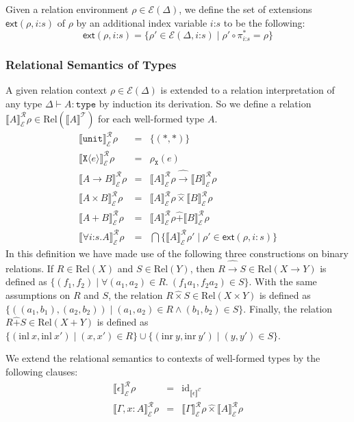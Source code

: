 \documentclass[natbib,preprint]{sigplanconf}
\newcommand{\sepbar}{\mathrel|}
\newcommand{\Rel}{\mathrm{Rel}}
\newcommand{\relArrow}{\mathrel{\widehat\to}}
\newcommand{\relTimes}{\mathrel{\widehat\times}}
\newcommand{\relSum}{\mathrel{\widehat+}}
\newcommand{\id}{\mathrm{id}}
\newcommand{\sortType}{\texttt{type}}
\newcommand{\tyUnit}{\texttt{unit}}
\newcommand{\tyPrim}[2]{\texttt{#1}\langle #2 \rangle}
\newcommand{\tyPrimNm}[1]{\texttt{#1}}
\newcommand{\tyArr}{\to}
\newcommand{\tyProduct}{\times}
\newcommand{\relEnv}[1]{\mathcal{#1}}
\newcommand{\tySem}[1]{\llbracket #1 \rrbracket^{\mathcal{T}}}
\newcommand{\ctxtSem}[1]{\llbracket #1 \rrbracket^{\mathcal{C}}}
\newcommand{\rsem}[3]{\llbracket #1 \rrbracket^{\mathcal{R}}_{#2}{#3}}
\newcommand{\extends}[2]{\mathsf{ext}(#1,#2)}
\begin{document}
Given a relation environment $\rho \in \relEnv{E}(\Delta)$, we define
the set of extensions $\extends{\rho}{i\mathord:s}$ of $\rho$ by an
additional index variable $i\mathord:s$ to be the following:
\begin{displaymath}
  \extends{\rho}{i\mathord:s} = \{ \rho' \in \relEnv{E}(\Delta,i\mathord:s) \sepbar \rho' \circ \pi^*_{i\mathord:s} = \rho \}
\end{displaymath}

\subsubsection{Relational Semantics of Types}

A given relation context $\rho \in \relEnv{E}(\Delta)$ is extended to
a relation interpretation of any type $\Delta \vdash A : \sortType$ by
induction its derivation. So we define a relation
$\rsem{A}{\relEnv{E}}{\rho} \in \Rel(\tySem{A})$ for each well-formed
type $A$.
\begin{eqnarray*}
  \rsem{\tyUnit}{\relEnv{E}}\rho & = & \{(*,*)\} \\
  \rsem{\tyPrim{X}{e}}{\relEnv{E}}\rho & = & \rho_{\tyPrimNm{X}}(e) \\
  \rsem{A \tyArr B}{\relEnv{E}}\rho & = & \rsem{A}{\relEnv{E}}\rho \relArrow \rsem{B}{\relEnv{E}}\rho \\
  \rsem{A \tyProduct B}{\relEnv{E}}\rho & = & \rsem{A}{\relEnv{E}}\rho \relTimes \rsem{B}{\relEnv{E}}\rho \\
  \rsem{A + B}{\relEnv{E}}\rho & = & \rsem{A}{\relEnv{E}}\rho \relSum \rsem{B}{\relEnv{E}}\rho \\
  \rsem{\forall i\mathord:s.A}{\relEnv{E}}\rho & = & \bigcap\{ \rsem{A}{\relEnv{E}}\rho' \sepbar \rho' \in \extends{\rho}{i:s} \}
\end{eqnarray*}
In this definition we have made use of the following three
constructions on binary relations. If $R \in \Rel(X)$ and $S \in
\Rel(Y)$, then $R \relArrow S \in \Rel(X \to Y)$ is defined as $\{
(f_1,f_2) \sepbar \forall (a_1,a_2) \in R.\ (f_1a_1,f_2a_2) \in S
\}$. With the same assumptions on $R$ and $S$, the relation $R
\relTimes S \in \Rel(X \times Y)$ is defined as $\{
((a_1,b_1),(a_2,b_2)) \sepbar (a_1,a_2) \in R \land (b_1,b_2) \in S
\}$. Finally, the relation $R \relSum S \in \Rel(X + Y)$ is defined as
$\{ (\mathrm{inl}\ x, \mathrm{inl}\ x') \sepbar (x,x') \in R \} \cup
\{ (\mathrm{inr}\ y, \mathrm{inr}\ y') \sepbar (y,y') \in S \}$.

We extend the relational semantics to contexts of well-formed types by
the following clauses:
\begin{eqnarray*}
  \rsem{\epsilon}{\relEnv{E}}{\rho} & = & \id_{\ctxtSem{\epsilon}} \\
  \rsem{\Gamma, x : A}{\relEnv{E}}{\rho} & = & \rsem{\Gamma}{\relEnv{E}}\rho \relTimes \rsem{A}{\relEnv{E}}\rho
\end{eqnarray*}
\end{document}
